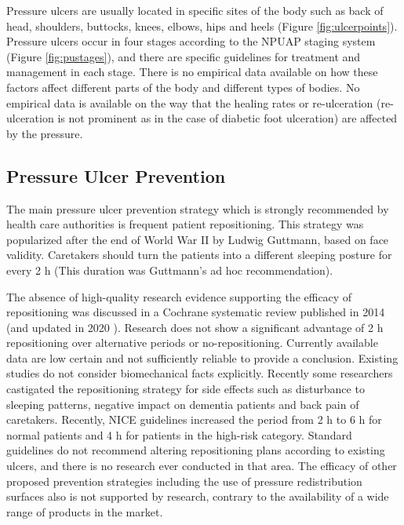 Pressure ulcers are usually located in specific sites of the body such as back of head, shoulders, buttocks,  knees, elbows, hips and heels (Figure \ref{fig:ulcerpoints}).  Pressure ulcers occur in four stages according to the NPUAP staging system (Figure \ref{fig:pustages}), and there are specific guidelines for treatment and management in each stage.\cite{npuapguide} There is no empirical data available on how these factors affect different parts of the body and different types of bodies. No empirical data is available on the way that the healing rates or re-ulceration (re-ulceration is not prominent as in the case of diabetic foot ulceration) are affected by the pressure. 

\subsection{Pressure Ulcer Prevention}
The main pressure ulcer prevention strategy which is strongly recommended by health care authorities is frequent patient repositioning. This strategy was popularized after the end of World War II by Ludwig Guttmann, based on face validity. \cite{biomechanics} Caretakers should turn the patients into a different sleeping posture for every 2 h (This duration was Guttmann's ad hoc recommendation).

The absence of high-quality research evidence supporting the efficacy of repositioning was discussed in a Cochrane systematic review published in 2014  \cite{cochrane14} (and updated in 2020  \cite{cochrane20}). Research does not show a significant advantage of 2 h repositioning over alternative periods or no-repositioning. Currently available data are low certain and not sufficiently reliable to provide a conclusion. Existing studies do not consider biomechanical facts explicitly. Recently some researchers castigated the repositioning strategy for side effects such as disturbance to sleeping patterns, negative impact on dementia patients and back pain of caretakers.\cite{elderabuse} Recently, NICE guidelines increased the period from 2 h to 6 h for normal patients and 4 h for patients in the high-risk category. \cite{sara} Standard guidelines do not recommend altering repositioning plans according to existing ulcers, and there is no research ever conducted in that area. The efficacy of other proposed prevention strategies including the use of pressure redistribution surfaces also is not supported by research, contrary to the availability of a wide range of products in the market. \cite{cochranesupport}

